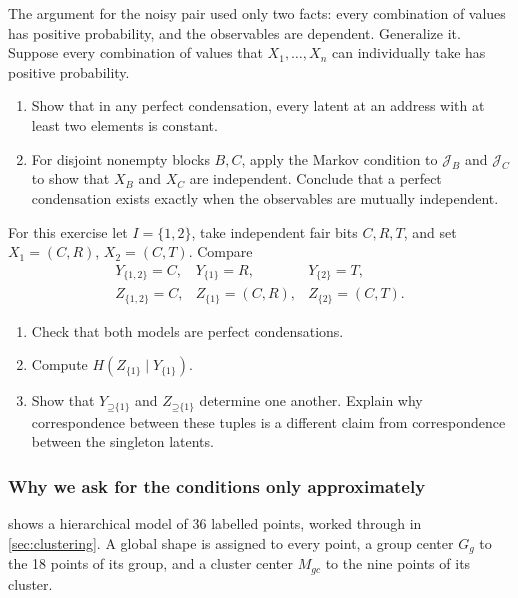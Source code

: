 \documentclass[11pt]{article}
\newcommand{\Up}{\mathord{\supseteq}}
\begin{document}
\begin{exercise}
\label{ex:fullsupport}
The argument for the noisy pair used only two facts: every combination of
values has positive probability, and the observables are dependent.
Generalize it. Suppose every combination of values that $X_1,\ldots,X_n$ can
individually take has positive probability.
\begin{enumerate}
\item Show that in any perfect condensation, every latent at an address with at
least two elements is constant.
\item For disjoint nonempty blocks $B,C$, apply the Markov condition to
$\mathcal{J}_B$ and $\mathcal{J}_C$ to show that $X_B$ and $X_C$ are
independent. Conclude that a perfect condensation exists exactly when the
observables are mutually independent.
\end{enumerate}
\end{exercise}

\begin{exercise}
\label{ex:duplicates}\important
For this exercise let $I=\{1,2\}$, take independent fair bits $C,R,T$, and set
$X_1=(C,R)$, $X_2=(C,T)$. Compare
\[
\begin{array}{lll}
 Y_{\{1,2\}}=C,&Y_{\{1\}}=R,&Y_{\{2\}}=T,\\
 Z_{\{1,2\}}=C,&Z_{\{1\}}=(C,R),&Z_{\{2\}}=(C,T).
\end{array}
\]
\begin{enumerate}
\item Check that both models are perfect condensations.
\item Compute $H(Z_{\{1\}}\mid Y_{\{1\}})$.
\item Show that $Y_{\Up\{1\}}$ and $Z_{\Up\{1\}}$ determine one
another. Explain why correspondence between these tuples is a different
claim from correspondence between the singleton latents.
\end{enumerate}
\end{exercise}

\subsubsection{Why we ask for the conditions only approximately}
 shows a hierarchical model of 36 labelled points, worked
through in \cref{sec:clustering}. A global shape is assigned to every point, a
group center $G_g$ to the 18 points of its group, and a cluster center $M_{gc}$
to the nine points of its cluster.
\end{document}
